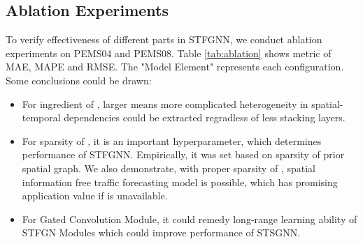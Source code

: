\documentclass[letterpaper]{article} \usepackage{aaai21}  \usepackage{times}  \usepackage{helvet} \usepackage{courier}  \usepackage[hyphens]{url}  \usepackage{graphicx} \urlstyle{rm} \def\UrlFont{\rm}  \usepackage{natbib}  \usepackage{caption} \frenchspacing  \setlength{\pdfpagewidth}{8.5in}  \setlength{\pdfpageheight}{11in}  \usepackage{multirow}
\begin{document}
\subsection{Ablation Experiments}

To verify effectiveness of different parts in STFGNN, we conduct ablation experiments on PEMS04 and PEMS08. Table \ref{tab:ablation} shows metric of MAE, MAPE and RMSE. The "Model Element" represents each configuration. Some conclusions could be drawn: 

\begin{itemize}
\item For ingredient of , larger  means more complicated heterogeneity in spatial-temporal dependencies could be extracted regradless of less stacking layers. 

\item For sparsity of , it is an important hyperparameter, which determines performance of STFGNN. Empirically, it was set based on sparsity of prior spatial graph. We also demonstrate, with proper sparsity of , spatial information free traffic forecasting model is possible, which has promising application value if  is unavailable.

\item For Gated Convolution Module, it could remedy long-range learning ability of STFGN Modules which could improve performance of STSGNN.
\end{itemize}
\end{document}
